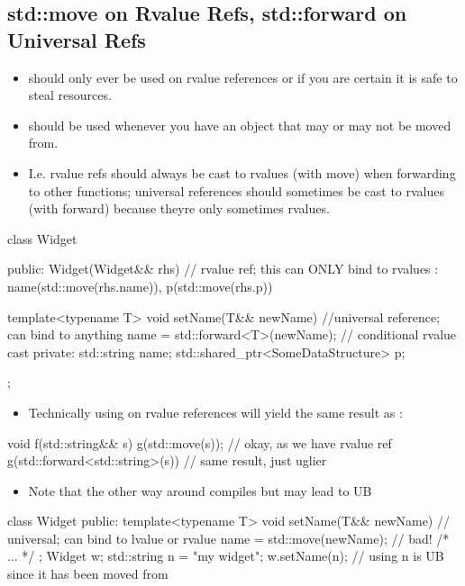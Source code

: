 \subsection{std::move on Rvalue Refs, std::forward on Universal Refs}
\begin{itemize}
  \item {} should only ever be used on rvalue references or if you are certain it is safe to steal resources.
  \item {} should be used whenever you have an object that may or may not be moved from. 
  \item I.e. rvalue refs should always be cast to rvalues (with move) when forwarding to other functions; universal references should sometimes be cast to rvalues (with forward) because theyre only sometimes rvalues.
\end{itemize}
\begin{cppcode}
class Widget {
public:
  Widget(Widget&& rhs) // rvalue ref; this can ONLY bind to rvalues
   : name(std::move(rhs.name)), p(std::move(rhs.p)) {}

  template<typename T>
  void setName(T&& newName) { //universal reference; can bind to anything
    name = std::forward<T>(newName); // conditional rvalue cast
  }
private:
  std::string name;
  std::shared_ptr<SomeDataStructure> p;

};
\end{cppcode}
\begin{itemize}
  \item Technically using  on rvalue references will yield the same result as :
\end{itemize}
\begin{cppcode}
void f(std::string&& s) {
  g(std::move(s)); // okay, as we have rvalue ref
  g(std::forward<std::string>(s)) // same result, just uglier
}
\end{cppcode}
\begin{itemize}
  \item Note that the other way around compiles but may lead to UB
\end{itemize}
\begin{cppcode}
class Widget {
public:
  template<typename T>
  void setName(T&& newName) { // universal; can bind to lvalue or rvalue
    name = std::move(newName); // bad!
  }
  /* ... */
};
Widget w;
std::string n = "my widget";
w.setName(n);
// using n is UB since it has been moved from
\end{cppcode}
